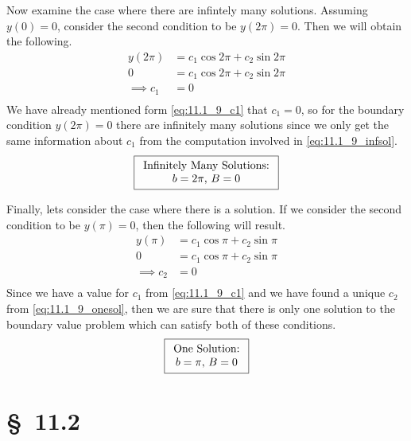 \documentclass[12pt]{article}
\begin{document}
Now examine the case where there are infintely many solutions.
Assuming $y(0)=0$, consider the second condition to be
$y(2\pi)=0$. Then we will obtain the following.
\begin{equation}
  \label{eq:11.1_9_infsol}
  \begin{aligned}
    y(2\pi)&=c_1\cos 2\pi + c_2\sin 2\pi \\
    0&=c_1\cos 2\pi + c_2\sin 2\pi \\
    \implies c_1 &= 0 \\
  \end{aligned}
\end{equation}
We have already mentioned form \cref{eq:11.1_9_c1} that $c_1=0$, so
for the boundary condition $y(2\pi)=0$ there are infinitely many
solutions since we only get the same information about $c_1$ from
the computation involved in \cref{eq:11.1_9_infsol}.
\begin{equation*}
\boxed{
  \begin{array}[c]{c}
    \text{Infinitely Many Solutions:} \\
    b=2\pi,\,B=0 \\
  \end{array}
}
\end{equation*}


Finally, lets consider the case where there is a solution. If we
consider the second condition to be $y(\pi)=0$, then the following will
result.
\begin{equation}
  \label{eq:11.1_9_onesol}
  \begin{aligned}
    y(\pi)&=c_1\cos \pi + c_2\sin \pi \\
    0&=c_1\cos \pi + c_2\sin \pi \\
    \implies c_2 &= 0 \\
  \end{aligned}
\end{equation}
Since we have a value for $c_1$ from \cref{eq:11.1_9_c1} and we have
found a unique $c_2$ from \cref{eq:11.1_9_onesol}, then we are sure
that there is only one solution to the boundary value problem which
can satisfy both of these conditions.
\begin{equation*}
\boxed{
  \begin{array}[c]{c}
    \text{One Solution:} \\
    b=\pi,\,B=0 \\
  \end{array}
}
\end{equation*}

\section{\S~11.2}
\end{document}
